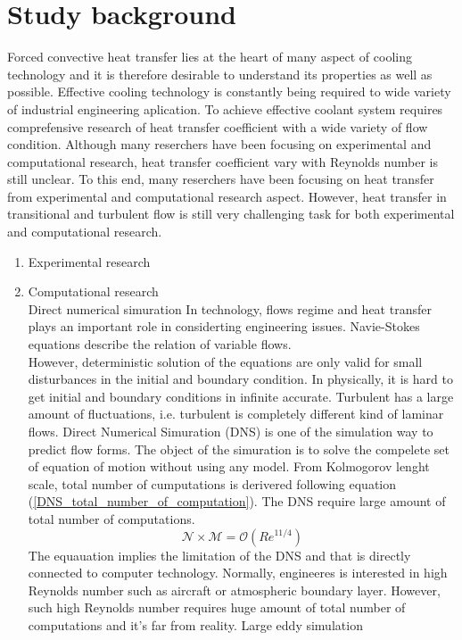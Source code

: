 \documentclass[12pt,oneside]{jbook}
\begin{document}
\section{Study background}
Forced convective heat transfer lies at the heart of many aspect of cooling technology and it is therefore desirable to understand its properties as well as possible.
Effective cooling technology is constantly being required to wide variety of industrial engineering aplication.
To achieve effective coolant system requires comprefensive research of heat transfer coefficient with a wide variety of flow condition.
Although many reserchers have been focusing on experimental and computational research, heat transfer coefficient vary with Reynolds number is still unclear.
To this end, many reserchers have been focusing on heat transfer from experimental and computational research aspect.
However, heat transfer in transitional and turbulent flow is still very challenging task for both experimental and computational research.
\begin{enumerate}
	\item Experimental research\\

	\item Computational research\\
	Direct numerical simuration
	In technology, flows regime and heat transfer plays an important role in considerting engineering issues.
	Navie-Stokes equations describe the relation of variable flows.
	\begin{equation}
		\
	\end{equation}
	However, deterministic solution of the equations are only valid for small disturbances in the initial and boundary condition.
	In physically, it is hard to get initial and boundary conditions in infinite accurate.
	Turbulent has a large amount of fluctuations, i.e. turbulent is completely different kind of laminar flows.
	Direct Numerical Simuration (DNS) is one of the simulation way to predict flow forms.
	The object of the simuration is to solve the compelete set of equation of motion without using any model.
	From Kolmogorov lenght scale, total number of cumputations is derivered following equation (\ref{DNS_total_number_of_computation}).
	The DNS require large amount of total number of computations.
	\begin{equation}
	    \mathcal N \times \mathcal M= \mathcal O (Re^{11/4})
	    \label{DNS_total_number_of_computation}
	\end{equation}
	The equauation implies the limitation of the DNS and that is directly connected to computer technology.
	Normally, engineeres is interested in high Reynolds number such as aircraft or atmospheric boundary layer.
	However, such high Reynolds number requires huge amount of total number of computations and it's far from reality.
	Large eddy simulation
\end{enumerate}
\end{document}
